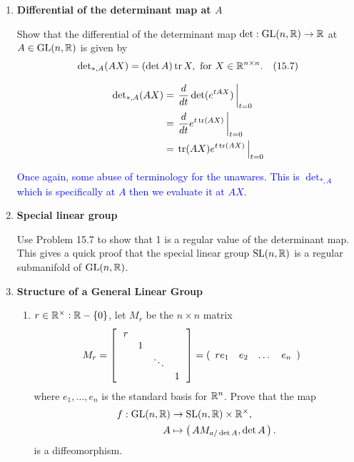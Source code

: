 \documentclass[12pt,a4paper]{report}
\newcommand{\RED}[1]{\textcolor{red}{#1}}
\newcommand{\BLUE}[1]{\textcolor{blue}{#1}}
\begin{document}
\begin{enumerate}[label=\textbf{15.\arabic*.}]
	\item \textbf{Differential of the determinant map at $A$}
	
	Show that the differential of the determinant map $\det: \operatorname{GL}(n,\mathbb{R})\to\mathbb{R}$ at $A\in \operatorname{GL}(n,\mathbb{R})$ is given by 
	\begin{align*}
		\operatorname{det}_{*,A}(AX) &= (\det A)\operatorname{tr} X, \text{ for }X \in \mathbb{R}^{n\times n}. &  (15.7)
	\end{align*}
	
	\RED{\begin{align*}
		\operatorname{det}_{*,A}(AX) &= \left . \frac{d}{dt}\det(e^{tAX}) \, \right |_{t=0} \\
		&= \left . \frac{d}{dt} e^{t\operatorname{tr}(AX)} \, \right |_{t=0} \\
		&= \left . \operatorname{tr}(AX)e^{t\operatorname{tr}(AX)} \, \right |_{t=0}
	\end{align*}
	}

	\BLUE{Once again, some abuse of terminology for the unawares.  This is $\operatorname{det}_{*,A}$ which is specifically at $A$ then we evaluate it at $AX$.
	}
	\item \textbf{Special linear group}
	
	Use Problem 15.7 to show that 1 is a regular value of the determinant map.  This gives a quick proof that the special linear group $\operatorname{SL}(n,\mathbb{R})$ is a regular submanifold of $\operatorname{GL}(n,\mathbb{R})$.
	
	\item \textbf{Structure of a General Linear Group}
	
	\begin{enumerate}[label=(\arabic*)]
	
		\item $r \in \mathbb{R}^\times: \mathbb{R}-\{0\}$, let $M_r$ be the $n\times n$ matrix
		\begin{align*}
			M_r &= \left [\, \begin{array}{cccc}
				r &   &  &  \\
				  & 1 &  &  \\
				  &   & \ddots & \\
				  &   &  & 1
			\end{array} \,\right ] = (\begin{array}{cccccccccc} re_1 & e_2 & \dots & e_n \end{array})
		\end{align*}where $e_1,\dots, e_n$ is the standard basis for $\mathbb{R}^n$.  Prove that the map 
		\begin{align*}
			f: \operatorname{GL}(n,\mathbb{R}) &\to \operatorname{SL}(n,\mathbb{R})\times \mathbb{R}^\times, \\
			A &\mapsto \left (\, AM_{a/\det A}, \det A \,\right ).
		\end{align*}is a diffeomorphism.
		

\end{enumerate}
\end{enumerate}
\end{document}
